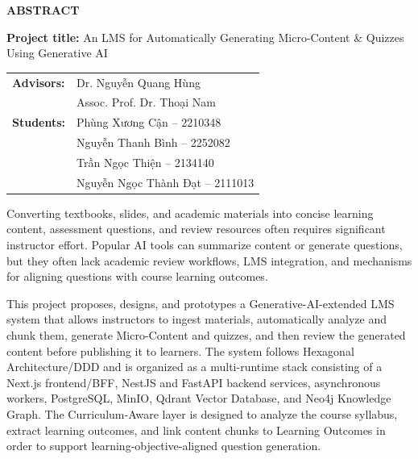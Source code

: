 \begin{center}
    \textbf{\Large ABSTRACT}
\end{center}

\vspace{0.5cm}

\noindent\textbf{Project title:} An LMS for Automatically Generating
Micro-Content \& Quizzes Using Generative AI

\smallskip

\noindent\begin{tabular}{@{}p{2.4cm}@{}l@{}}
  \textbf{Advisors:} & Dr. Nguyễn Quang Hùng \\
                     & Assoc. Prof. Dr. Thoại Nam \\[4pt]
  \textbf{Students:} & Phùng Xương Cận -- 2210348 \\
                     & Nguyễn Thanh Bình -- 2252082 \\
                     & Trần Ngọc Thiện -- 2134140 \\
                     & Nguyễn Ngọc Thành Đạt -- 2111013 \\
\end{tabular}

\vspace{0.7cm}

Converting textbooks, slides, and academic materials into concise learning
content, assessment questions, and review resources often requires significant
instructor effort. Popular AI tools can summarize content or generate
questions, but they often lack academic review workflows, LMS integration, and
mechanisms for aligning questions with course learning outcomes.

This project proposes, designs, and prototypes a Generative-AI-extended LMS
system that allows instructors to ingest materials, automatically analyze and
chunk them, generate Micro-Content and quizzes, and then review the generated
content before publishing it to learners. The system follows Hexagonal
Architecture/DDD and is organized as a multi-runtime stack consisting of a
Next.js frontend/BFF, NestJS and FastAPI backend services, asynchronous
workers, PostgreSQL, MinIO, Qdrant Vector Database, and Neo4j Knowledge
Graph. The Curriculum-Aware layer is designed to analyze the course syllabus,
extract learning outcomes, and link content chunks to Learning Outcomes in
order to support learning-objective-aligned question generation.

